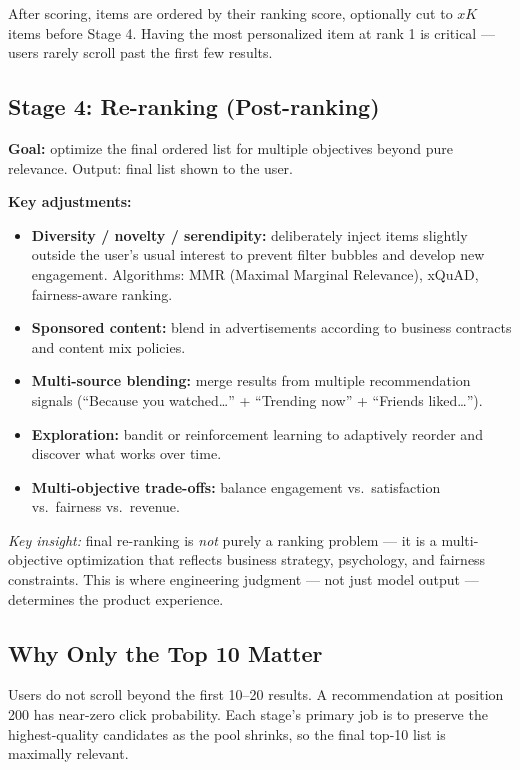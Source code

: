 \documentclass[11pt]{article}
\begin{document}
After scoring, items are ordered by their ranking score, optionally cut to
$xK$ items before Stage 4. Having the most personalized item at rank 1 is
critical --- users rarely scroll past the first few results.

\subsection{Stage 4: Re-ranking (Post-ranking)}
\textbf{Goal:} optimize the final ordered list for multiple objectives
beyond pure relevance. Output: final list shown to the user.

\textbf{Key adjustments:}
\begin{itemize}
    \item \textbf{Diversity / novelty / serendipity:} deliberately inject
      items slightly outside the user's usual interest to prevent filter
      bubbles and develop new engagement. Algorithms: MMR (Maximal Marginal
      Relevance), xQuAD, fairness-aware ranking.
    \item \textbf{Sponsored content:} blend in advertisements according to
      business contracts and content mix policies.
    \item \textbf{Multi-source blending:} merge results from multiple
      recommendation signals (``Because you watched\ldots'' +
      ``Trending now'' + ``Friends liked\ldots'').
    \item \textbf{Exploration:} bandit or reinforcement learning to
      adaptively reorder and discover what works over time.
    \item \textbf{Multi-objective trade-offs:} balance engagement vs.\
      satisfaction vs.\ fairness vs.\ revenue.
\end{itemize}

\textit{Key insight:} final re-ranking is \emph{not} purely a ranking
problem --- it is a multi-objective optimization that reflects business
strategy, psychology, and fairness constraints. This is where engineering
judgment --- not just model output --- determines the product experience.

\subsection{Why Only the Top 10 Matter}
Users do not scroll beyond the first 10--20 results. A recommendation at
position 200 has near-zero click probability. Each stage's primary job is
to preserve the highest-quality candidates as the pool shrinks, so the
final top-10 list is maximally relevant.
\end{document}
